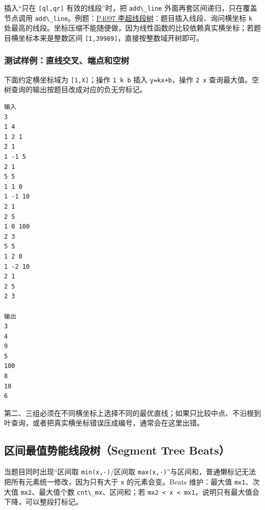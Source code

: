 插入``只在 \passthrough{\lstinline![ql,qr]!} 有效的线段''时，把 \passthrough{\lstinline!add\_line!} 外面再套区间递归，只在覆盖节点调用 \passthrough{\lstinline!add\_line!}。例题：\href{https://www.luogu.com.cn/problem/P4097}{P4097 李超线段树}：题目插入线段、询问横坐标 \passthrough{\lstinline!k!} 处最高的线段。坐标压缩不能随便做，因为线性函数的比较依赖真实横坐标；若题目横坐标本来是整数区间 \passthrough{\lstinline![1,39989]!}，直接按整数域开树即可。

\subsubsection{测试样例：直线交叉、端点和空树}

下面约定横坐标域为 \passthrough{\lstinline![1,X]!}；操作 \passthrough{\lstinline!1 k b!} 插入 \passthrough{\lstinline!y=kx+b!}，操作 \passthrough{\lstinline!2 x!} 查询最大值。空树查询的输出按题目改成对应的负无穷标记。

\begin{lstlisting}
输入
3
1 4
1 2 1
2 1
1 -1 5
2 1
5 5
1 1 0
1 -1 10
2 1
2 5
1 0 100
2 3
5 5
1 2 0
1 -2 10
2 1
2 5
2 3

输出
3
4
9
5
100
8
10
6
\end{lstlisting}

第二、三组必须在不同横坐标上选择不同的最优直线；如果只比较中点、不沿根到叶查询，或者把真实横坐标错误压成编号，通常会在这里出错。


\subsection{区间最值势能线段树（Segment Tree Beats）}

当题目同时出现``区间取 \passthrough{\lstinline!min(x,·)!}/区间取 \passthrough{\lstinline!max(x,·)!}''与区间和，普通懒标记无法把所有元素统一修改，因为只有大于 \passthrough{\lstinline!x!} 的元素会变。Beats 维护：最大值 \passthrough{\lstinline!mx1!}、次大值 \passthrough{\lstinline!mx2!}、最大值个数 \passthrough{\lstinline!cnt\_mx!}、区间和；若 \passthrough{\lstinline!mx2 < x < mx1!}，说明只有最大值会下降，可以整段打标记。

